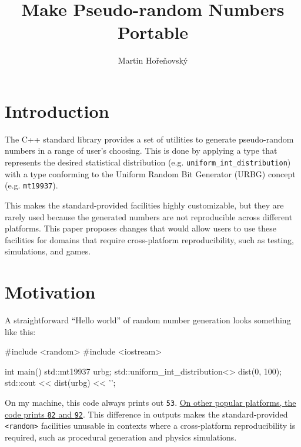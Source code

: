 \documentclass{wg21}
\title{Make Pseudo-random Numbers Portable}
\author{Martin Hořeňovský}{martin.horenovsky@gmail.com}
\begin{document}
\maketitle



\hypertarget{introduction}{%
    \section{Introduction}\label{introduction}}

The C++ standard library provides a set of utilities to generate
pseudo-random numbers in a range of user's choosing. This is done
by applying a type that represents the desired statistical distribution
(e.g. \texttt{uniform\_int\_distribution}) with a type conforming
to the Uniform Random Bit Generator (URBG) concept (e.g. \texttt{mt19937}).

This makes the standard-provided facilities highly customizable, but they
are rarely used because the generated numbers are not reproducible
across different platforms. This paper proposes changes that would allow
users to use these facilities for domains that require cross-platform
reproducibility, such as testing, simulations, and games.


\hypertarget{motivation}{%
    \section{Motivation}\label{motivation}}

A straightforward ``Hello world'' of random number generation looks something
like this:

\begin{codeblock}
#include <random>
#include <iostream>

int main() {
    std::mt19937 urbg;
    std::uniform_int_distribution<> dist(0, 100);
    std::cout << dist(urbg) << '\n';
}
\end{codeblock}

On my machine, this code always prints out \texttt{53}. \href{https://godbolt.org/z/dB7H_2}{On other
popular platforms, the code prints \texttt{82} and \texttt{92}}. This
difference in outputs makes the standard-provided \texttt{<random>}
facilities unusable in contexts where a cross-platform reproducibility
is required, such as procedural generation and physics simulations.
\end{document}

